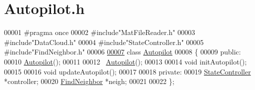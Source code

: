 \hypertarget{_autopilot_8h_source}{}\section{Autopilot.\+h}
\label{_autopilot_8h_source}

\begin{DoxyCode}
00001 \textcolor{preprocessor}{#pragma once}
00002 \textcolor{preprocessor}{#include"MatFileReader.h"}
00003 \textcolor{preprocessor}{#include"DataCloud.h"}
00004 \textcolor{preprocessor}{#include"StateController.h"}
00005 \textcolor{preprocessor}{#include"FindNeighbor.h"}
00006 
\hyperlink{class_autopilot}{00007} \textcolor{keyword}{class }\hyperlink{class_autopilot}{Autopilot}
00008 \{
00009 \textcolor{keyword}{public}: 
00010     \hyperlink{class_autopilot}{Autopilot}();
00011 
00012     ~\hyperlink{class_autopilot}{Autopilot}();
00013 
00014     \textcolor{keywordtype}{void} initAutopilot();
00015 
00016     \textcolor{keywordtype}{void} updateAutopilot();
00017 
00018 \textcolor{keyword}{private}:
00019     \hyperlink{class_state_controller}{StateController} *controller;
00020     \hyperlink{class_find_neighbor}{FindNeighbor} *neigh;
00021 
00022 \};
\end{DoxyCode}
